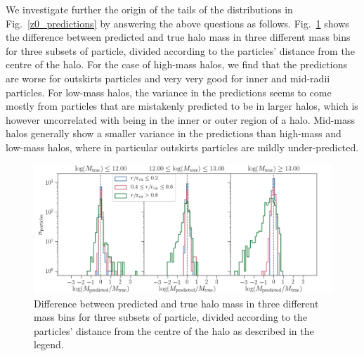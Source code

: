 \documentclass[11pt]{article}
\begin{document}
We investigate further the origin of the tails of the distributions in Fig.~\ref{z0_predictions} by answering the above questions as follows. Fig.~\ref{fig:histogram_radii} shows the difference between predicted and true halo mass in three different mass bins for three subsets of particle, divided according to the particles' distance from the centre of the halo. For the case of high-mass halos, we find that the predictions are worse for outskirts particles and very very good for inner and mid-radii particles. For low-mass halos, the variance in the predictions seems to come mostly from particles that are mistakenly predicted to be in larger halos, which is however uncorrelated with being in the inner or outer region of a halo. Mid-mass halos generally show a smaller variance in the predictions than high-mass and low-mass halos, where in particular outskirts particles are mildly under-predicted.

\begin{figure}
	\centering
	\includegraphics[width=\columnwidth]{z0/predictions_mass_and_radius_bins.png}
	\caption{Difference between predicted and true halo mass in three different mass bins for three subsets of particle, divided according to the particles' distance from the centre of the halo as described in the legend.}
	\label{fig:histogram_radii}
\end{figure}
\end{document}
